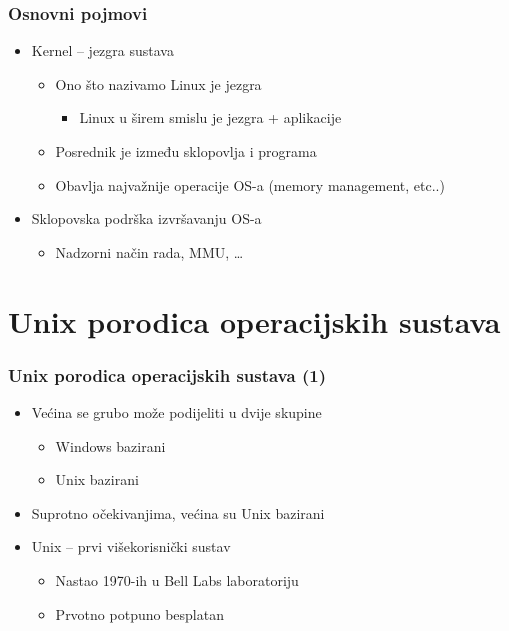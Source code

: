 \documentclass{beamer}
\begin{document}
\begin{frame}[t]
\frametitle{Osnovni pojmovi}
\begin{itemize}
  \item Kernel -- jezgra sustava
  \begin{itemize}
    \item Ono što nazivamo Linux je jezgra
    \begin{itemize}
      \item Linux u širem smislu je jezgra + aplikacije
    \end{itemize}
    \item Posrednik je između sklopovlja i programa
    \item Obavlja najvažnije operacije OS-a (memory management, etc..)
  \end{itemize}
  \item Sklopovska podrška izvršavanju OS-a
  \begin{itemize}
    \item Nadzorni način rada, MMU, \ldots
  \end{itemize}
\end{itemize}
\end{frame}

\section{Unix porodica operacijskih sustava}
\begin{frame}[t]
\frametitle{Unix porodica operacijskih sustava (1)}
\begin{itemize}
  \item Većina se grubo može podijeliti u dvije skupine
  \begin{itemize}
    \item Windows bazirani
    \item Unix bazirani
  \end{itemize}
  \item Suprotno očekivanjima, većina su Unix bazirani
  \item Unix – prvi višekorisnički sustav
  \begin{itemize}
    \item Nastao 1970-ih u Bell Labs laboratoriju
    \item Prvotno potpuno besplatan
  \end{itemize}
\end{itemize}
\end{frame} 
\end{document}
